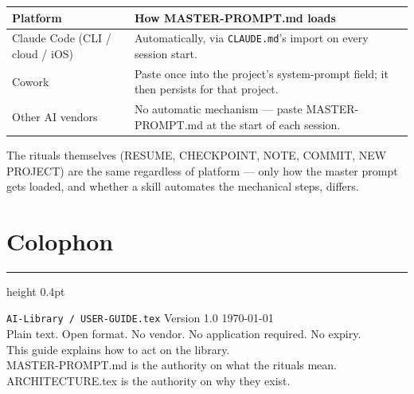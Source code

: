 \documentclass[12pt,letterpaper]{article}
\begin{document}
\begin{center}
\begin{tabular}{@{}lp{8.5cm}@{}}
\toprule
\textbf{Platform} & \textbf{How MASTER-PROMPT.md loads} \\
\midrule
Claude Code (CLI / cloud / iOS) & Automatically, via \texttt{CLAUDE.md}'s
import on every session start. \\
Cowork & Paste once into the project's system-prompt field; it then
persists for that project. \\
Other AI vendors & No automatic mechanism --- paste MASTER-PROMPT.md at
the start of each session. \\
\bottomrule
\end{tabular}
\end{center}

The rituals themselves (RESUME, CHECKPOINT, NOTE, COMMIT, NEW PROJECT) are
the same regardless of platform --- only how the master prompt gets
loaded, and whether a skill automates the mechanical steps, differs.

\section*{Colophon}

\vspace{8pt}
\hrule height 0.4pt
\vspace{12pt}

\begin{center}
{\small\texttt{AI-Library / USER-GUIDE.tex} \quad Version 1.0 \quad \today}\\[6pt]
{\small Plain text. Open format. No vendor. No application required. No expiry.}\\[4pt]
{\footnotesize
This guide explains how to act on the library.\\
MASTER-PROMPT.md is the authority on what the rituals mean.\\
ARCHITECTURE.tex is the authority on why they exist.
}
\end{center}
\end{document}
